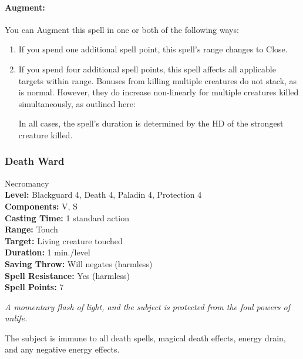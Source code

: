 \paragraph{Augment:} You can Augment this spell in one or both of the following ways:
\begin{enumerate}
 \item If you spend one additional spell point, this spell's range changes to Close.
 \item If you spend four additional spell points, this spell affects all applicable targets within range.
 Bonuses from killing multiple creatures do not stack, as is normal.
 However, they do increase non-linearly for multiple creatures killed simultaneously, as outlined here:
 In all cases, the spell's duration is determined by the HD of the strongest creature killed.
\end{enumerate}
\subsubsection{Death Ward}
\label{Spell:DeathWard}
Necromancy
\\ \textbf{Level:} Blackguard 4, Death 4, Paladin 4, Protection 4
\\ \textbf{Components:} V, S
\\ \textbf{Casting Time:} 1 standard action
\\ \textbf{Range:} Touch
\\ \textbf{Target:} Living creature touched
\\ \textbf{Duration:} 1 min./level
\\ \textbf{Saving Throw:} Will negates (harmless)
\\ \textbf{Spell Resistance:} Yes (harmless)
\\ \textbf{Spell Points:} 7

\emph{A momentary flash of light, and the subject is protected from the foul powers of unlife.}

The subject is immune to all death spells, magical death effects, energy drain, and any negative energy effects.

